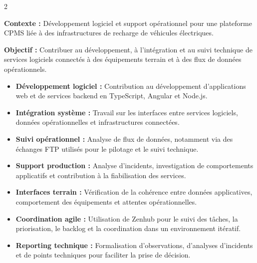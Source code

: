 \documentclass[8pt,a4paper,ragged2e,withhyper]{altacv}
\begin{document}



\makecvheader
\vspace{-0.3cm}


\begin{paracol}{2}



\textbf{Contexte :} Développement logiciel et support opérationnel pour une plateforme CPMS liée à des infrastructures de recharge de véhicules électriques.

\textbf{Objectif :} Contribuer au développement, à l’intégration et au suivi technique de services logiciels connectés à des équipements terrain et à des flux de données opérationnels.

\begin{itemize}
  \item \textbf{Développement logiciel :} Contribution au développement d’applications web et de services backend en TypeScript, Angular et Node.js.
  \item \textbf{Intégration système :} Travail sur les interfaces entre services logiciels, données opérationnelles et infrastructures connectées.
  \item \textbf{Suivi opérationnel :} Analyse de flux de données, notamment via des échanges FTP utilisés pour le pilotage et le suivi technique.
  \item \textbf{Support production :} Analyse d’incidents, investigation de comportements applicatifs et contribution à la fiabilisation des services.
  \item \textbf{Interfaces terrain :} Vérification de la cohérence entre données applicatives, comportement des équipements et attentes opérationnelles.
  \item \textbf{Coordination agile :} Utilisation de Zenhub pour le suivi des tâches, la priorisation, le backlog et la coordination dans un environnement itératif.
  \item \textbf{Reporting technique :} Formalisation d’observations, d’analyses d’incidents et de points techniques pour faciliter la prise de décision.
\end{itemize}


\end{paracol}
\end{document}
